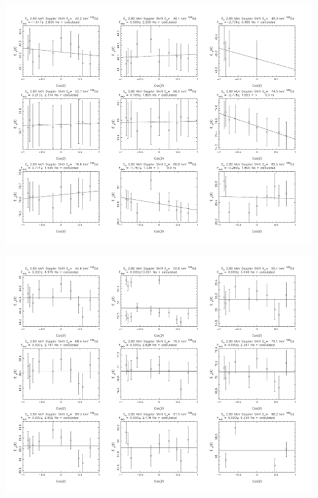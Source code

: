 \begin{center}
\includegraphics[page=23,angle=90,height=0.95\textheight]{160Gd_28ftau_LE_no.pdf}
\end{center}
\begin{center}
\includegraphics[page=24,angle=90,height=0.95\textheight]{160Gd_28ftau_HE_no.pdf}
\end{center}
